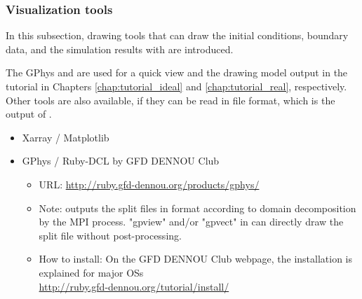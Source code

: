\subsubsection{Visualization tools}

In this subsection, drawing tools that can draw the initial conditions, boundary data, and the simulation results with \scaledg are introduced.

The GPhys and \grads are used for a quick view
and the drawing model output in the tutorial in Chapters \ref{chap:tutorial_ideal} and \ref{chap:tutorial_real}, respectively.
Other tools are also available,
if they can be read in \netcdf file format, which is the output of \scaledg.

\begin{itemize}
\item Xarray / Matplotlib

\item GPhys / Ruby-DCL by GFD DENNOU Club
 \begin{itemize}
  \item URL: \url{http://ruby.gfd-dennou.org/products/gphys/}
  \item Note: \scalelib outputs the split files
  in {\netcdf} format according to domain decomposition by the MPI process.
  "gpview" and/or "gpvect" in {\gphys} can directly draw the split file without post-processing.
  \item How to install:
  On the GFD DENNOU Club webpage, the installation is explained for major OSs\\
  \url{http://ruby.gfd-dennou.org/tutorial/install/}\\
   \end{itemize}
\end{itemize}


